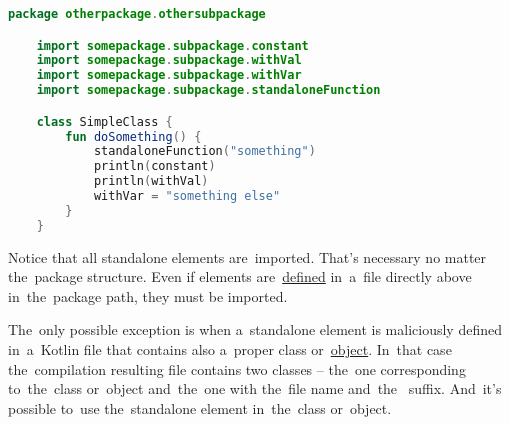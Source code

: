 \begin{lstlisting}[language=Kotlin, title={Usage}]
    package otherpackage.othersubpackage

    import somepackage.subpackage.constant
    import somepackage.subpackage.withVal
    import somepackage.subpackage.withVar
    import somepackage.subpackage.standaloneFunction

    class SimpleClass {
        fun doSomething() {
            standaloneFunction("something")
            println(constant)
            println(withVal)
            withVar = "something else"
        }
    }
\end{lstlisting}
\noindent Notice that all standalone elements are~imported.
That's necessary no matter the~package structure.
Even if elements are~\hyperref[declarationdefinition]{defined} in~a~file directly above in~the~package path, they must be imported.

The~only possible exception is when a~standalone element is maliciously defined in~a~Kotlin file that contains also a~proper class or~\hyperref[kotlinobject]{object}.
In~that case the~compilation resulting  file contains two classes -- the~one corresponding to~the~class or~object and~the~one with the~file name \mbox{and the } suffix.
And~it's possible to~use the~standalone element in~the~class or~object.
